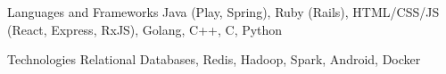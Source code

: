 
\begin{cvskills}
  \cvskill
    {Languages and Frameworks} %
    {Java (Play, Spring), Ruby (Rails), HTML/CSS/JS (React, Express, RxJS), Golang, C++, C, Python } %

  \cvskill
    {Technologies} %
    {Relational Databases, Redis, Hadoop, Spark, Android, Docker} %
\end{cvskills}
